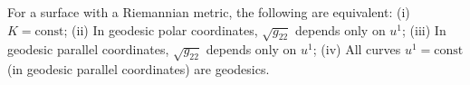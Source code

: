 For a surface with a Riemannian metric, the following are equivalent:
(i) $K = \text{const}$;
(ii) In geodesic polar coordinates, $\sqrt{g_{22}}$ depends only on $u^1$;
(iii) In geodesic parallel coordinates, $\sqrt{g_{22}}$ depends only on $u^1$;
(iv) All curves $u^1 = \text{const}$ (in geodesic parallel coordinates) are geodesics.